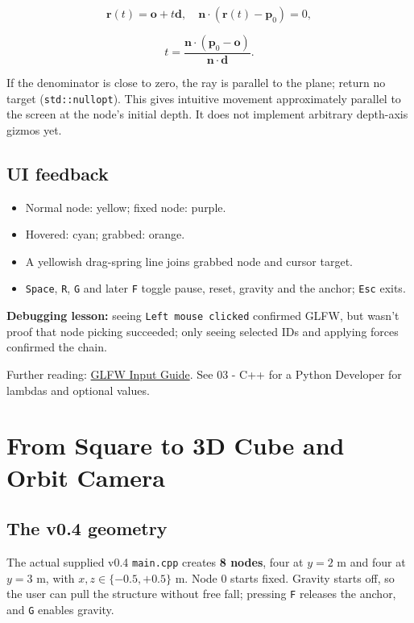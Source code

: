 \documentclass[
  10pt,
  a4paper,
]{article}
\providecommand{\tightlist}{%
  \setlength{\itemsep}{0pt}\setlength{\parskip}{0pt}}
\begin{document}
\[\mathbf r(t)=\mathbf o+t\mathbf d, \quad \mathbf n\cdot(\mathbf r(t)-\mathbf p_0)=0,\]

\[\boxed{t=\frac{\mathbf n\cdot(\mathbf p_0-\mathbf o)}{\mathbf n\cdot\mathbf d}}.\]

If the denominator is close to zero, the ray is parallel to the plane;
return no target (\texttt{std::nullopt}). This gives intuitive movement
approximately parallel to the screen at the node's initial depth. It
does not implement arbitrary depth-axis gizmos yet.

\subsection{UI feedback}\label{ui-feedback}

\begin{itemize}
\tightlist
\item
  Normal node: yellow; fixed node: purple.
\item
  Hovered: cyan; grabbed: orange.
\item
  A yellowish drag-spring line joins grabbed node and cursor target.
\item
  \texttt{Space}, \texttt{R}, \texttt{G} and later \texttt{F} toggle
  pause, reset, gravity and the anchor; \texttt{Esc} exits.
\end{itemize}

\textbf{Debugging lesson:} seeing \texttt{Left\ mouse\ clicked}
confirmed GLFW, but wasn't proof that node picking succeeded; only
seeing selected IDs and applying forces confirmed the chain.

Further reading: \href{https://www.glfw.org/docs/latest/input.html}{GLFW
Input Guide}. See 03 - C++ for a Python Developer for lambdas and
optional values.

\newpage

\section{From Square to 3D Cube and Orbit
Camera}\label{from-square-to-3d-cube-and-orbit-camera}

\subsection{The v0.4 geometry}\label{the-v0.4-geometry}

The actual supplied v0.4 \texttt{main.cpp} creates \textbf{8 nodes},
four at \(y=2\) m and four at \(y=3\) m, with \(x,z\in\{-0.5,+0.5\}\) m.
Node 0 starts fixed. Gravity starts off, so the user can pull the
structure without free fall; pressing \texttt{F} releases the anchor,
and \texttt{G} enables gravity.
\end{document}
